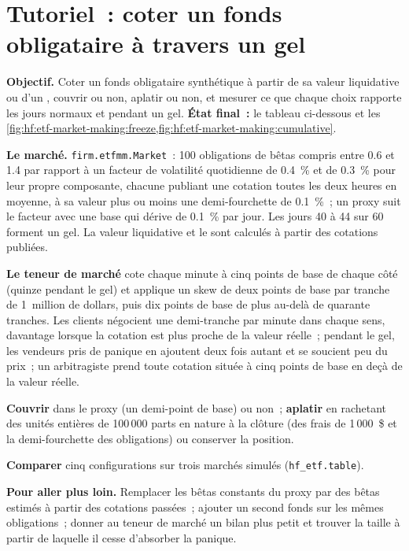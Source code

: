 \section{Tutoriel~: coter un fonds obligataire à travers un gel}\label{tut:hf:etf-market-making:tut}

\begin{tutorial}
\textbf{Objectif.} Coter un fonds obligataire synthétique à partir de sa valeur liquidative ou d'un , couvrir ou non, aplatir ou non, et mesurer ce que chaque
choix rapporte les jours normaux et pendant un gel. \textbf{État final~:} le tableau ci-dessous et les \cref{fig:hf:etf-market-making:freeze,fig:hf:etf-market-making:cumulative}.
\begin{tutsteps}
\item \textbf{Le marché.} \texttt{firm.etfmm.Market}~: 100 obligations de bêtas compris entre 0.6 et 1.4 par rapport à un facteur de volatilité quotidienne de 0.4~\% et de 0.3~\% pour leur propre composante,
chacune publiant une cotation toutes les deux heures en moyenne, à sa valeur plus ou moins une demi-fourchette de 0.1~\%~; un proxy suit le facteur avec une base qui dérive de
0.1~\% par jour. Les jours 40 à 44 sur 60 forment un gel. La valeur liquidative et le  sont calculés à partir des cotations publiées.
\label{lst:hf:etf-market-making:market}
\item \textbf{Le teneur de marché} cote chaque minute à cinq points de base de chaque côté (quinze pendant le gel) et applique un skew de deux points de base par tranche
de 1~million de dollars, puis dix points de base de plus au-delà de quarante tranches. Les clients négocient une demi-tranche par minute dans chaque sens, davantage lorsque la cotation est plus proche de la valeur réelle~; pendant le gel,
les vendeurs pris de panique en ajoutent deux fois autant et se soucient peu du prix~; un arbitragiste prend toute cotation située à cinq points de base en deçà de la valeur réelle.
\label{lst:hf:etf-market-making:quote}
\item \textbf{Couvrir} dans le proxy (un demi-point de base) ou non~; \textbf{aplatir} en rachetant des unités entières de 100\,000 parts en nature à la clôture
(des frais de 1\,000~\$ et la demi-fourchette des obligations) ou conserver la position.
\item \textbf{Comparer} cinq configurations sur trois marchés simulés (\texttt{hf\_etf.table}).
\end{tutsteps}
\textbf{Pour aller plus loin.} Remplacer les bêtas constants du proxy par des bêtas estimés à partir des cotations passées~; ajouter un second fonds sur les mêmes obligations~; donner au
teneur de marché un bilan plus petit et trouver la taille à partir de laquelle il cesse d'absorber la panique.
\end{tutorial}

